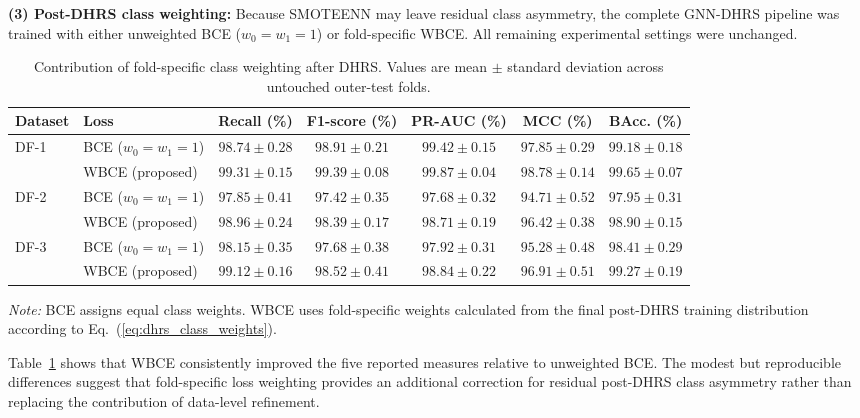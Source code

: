 \documentclass[pdflatex,sn-mathphys-num]{sn-jnl}%
\theoremstyle{thmstyleone}%
\theoremstyle{thmstyletwo}%
\theoremstyle{thmstylethree}%
\begin{document}
\textbf{(3) Post-DHRS class weighting:}  {
Because SMOTEENN may leave residual class asymmetry, the complete GNN-DHRS
pipeline was trained with either unweighted BCE
(\(w_0=w_1=1\)) or fold-specific WBCE. All remaining experimental settings
were unchanged.
}

\begingroup
 
\begin{table}[!ht]
\centering
\caption{
Contribution of fold-specific class weighting after DHRS. Values are mean
\(\pm\) standard deviation across untouched outer-test folds.
}
\label{tab:dhrs_weight_ablation}
\scriptsize
\setlength{\tabcolsep}{3.8pt}
\renewcommand{\arraystretch}{1.05}
\begin{tabular}{@{}llccccc@{}}
\toprule
\textbf{Dataset} &
\textbf{Loss} &
\textbf{Recall (\%)} &
\textbf{F1-score (\%)} &
\textbf{PR-AUC (\%)} &
\textbf{MCC (\%)} &
\textbf{BAcc. (\%)} \\
\midrule
\multirow{2}{*}{DF-1}
& BCE (\(w_0=w_1=1\))
& $98.74\pm0.28$ & $98.91\pm0.21$ & $99.42\pm0.15$
& $97.85\pm0.29$ & $99.18\pm0.18$ \\
& WBCE (proposed)
& $99.31\pm0.15$ & $99.39\pm0.08$ & $99.87\pm0.04$
& $98.78\pm0.14$ & $99.65\pm0.07$ \\
\midrule
\multirow{2}{*}{DF-2}
& BCE (\(w_0=w_1=1\))
& $97.85\pm0.41$ & $97.42\pm0.35$ & $97.68\pm0.32$
& $94.71\pm0.52$ & $97.95\pm0.31$ \\
& WBCE (proposed)
& $98.96\pm0.24$ & $98.39\pm0.17$ & $98.71\pm0.19$
& $96.42\pm0.38$ & $98.90\pm0.15$ \\
\midrule
\multirow{2}{*}{DF-3}
& BCE (\(w_0=w_1=1\))
& $98.15\pm0.35$ & $97.68\pm0.38$ & $97.92\pm0.31$
& $95.28\pm0.48$ & $98.41\pm0.29$ \\
& WBCE (proposed)
& $99.12\pm0.16$ & $98.52\pm0.41$ & $98.84\pm0.22$
& $96.91\pm0.51$ & $99.27\pm0.19$ \\
\bottomrule
\end{tabular}

\vspace{2pt}
\begin{minipage}{0.98\textwidth}
\footnotesize
\textit{Note:} BCE assigns equal class weights. WBCE uses fold-specific
weights calculated from the final post-DHRS training distribution according
to Eq.~(\ref{eq:dhrs_class_weights}).
\end{minipage}
\end{table}
\endgroup

 {
Table~\ref{tab:dhrs_weight_ablation} shows that WBCE consistently improved
the five reported measures relative to unweighted BCE. The modest but
reproducible differences suggest that fold-specific loss weighting provides
an additional correction for residual post-DHRS class asymmetry rather than
replacing the contribution of data-level refinement.
}
\end{document}
